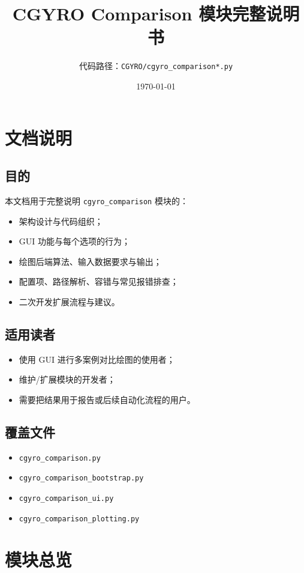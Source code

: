 \documentclass[11pt,a4paper]{ctexart}
\title{CGYRO Comparison 模块完整说明书}
\author{代码路径：\texttt{CGYRO/cgyro\_comparison*.py}}
\date{\today}
\begin{document}
\maketitle
\tableofcontents
\newpage

\section{文档说明}
\subsection{目的}
本文档用于完整说明 \texttt{cgyro\_comparison} 模块的：
\begin{itemize}
  \item 架构设计与代码组织；
  \item GUI 功能与每个选项的行为；
  \item 绘图后端算法、输入数据要求与输出；
  \item 配置项、路径解析、容错与常见报错排查；
  \item 二次开发扩展流程与建议。
\end{itemize}

\subsection{适用读者}
\begin{itemize}
  \item 使用 GUI 进行多案例对比绘图的使用者；
  \item 维护/扩展模块的开发者；
  \item 需要把结果用于报告或后续自动化流程的用户。
\end{itemize}

\subsection{覆盖文件}
\begin{itemize}
  \item \texttt{cgyro\_comparison.py}
  \item \texttt{cgyro\_comparison\_bootstrap.py}
  \item \texttt{cgyro\_comparison\_ui.py}
  \item \texttt{cgyro\_comparison\_plotting.py}
\end{itemize}

\section{模块总览}
\end{document}
